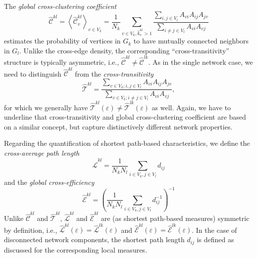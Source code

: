 The \textit{global cross-clustering coefficient}
\begin{equation}
\hat{\mathcal{C}}^{kl} = \left<\hat{\mathcal{C}}_v^{kl}\right>_{v \in V_k} = \frac{1}{N_k} \sum_{v \in V_k, \hat{k}_v^{kl}>1} \frac{\sum_{i,j \in V_l} A_{vi} A_{ij} A_{jv}}{\sum_{i \neq j \in V_l} A_{vi} A_{vj}}
\label{eq:globclustering_cross}
\end{equation}
estimates the probability of vertices in $G_k$ to have mutually connected neighbors in $G_l$. Unlike the cross-edge density, the corresponding ``cross-transitivity'' structure is typically asymmetric, i.e., $\hat{\mathcal{C}}^{kl} \neq \hat{\mathcal{C}}^{lk}$. As in the single network case, we need to distinguish $\hat{\mathcal{C}}^{kl}$ from the \textit{cross-transitivity}
\begin{equation}
\hat{\mathcal{T}}^{kl} = \frac{\sum_{v \in V_k; i,j \in V_l} A_{vi} A_{ij} A_{jv}}{\sum_{v \in V_k; i \neq j \in V_l} A_{vi}  A_{vj}},
\label{eq:transitivity_cross}
\end{equation}
for which we generally have $\hat{\mathcal{T}}^{kl}(\varepsilon) \neq \hat{\mathcal{T}}^{lk}(\varepsilon)$ as well. Again, we have to underline that cross-transitivity and global cross-clustering coefficient are based on a similar concept, but capture distinctively different network properties.

Regarding the quantification of shortest path-based characteristics, we define the \textit{cross-average path length}
\begin{equation}
\hat{\mathcal{L}}^{kl} = \frac{1}{N_k N_l} \sum_{i \in V_k, j \in V_l} d_{ij} %
\label{eq:apl_cross}
\end{equation}
and the \textit{global cross-efficiency}
\begin{equation}
\hat{\mathcal{E}}^{kl} = \left( \frac{1}{N_k N_l} \sum_{i \in V_k, j \in V_l} d_{ij}^{-1} \right)^{-1} %
\label{eq:globefficiency_cross}
\end{equation}
\noindent
Unlike $\hat{\mathcal{C}}^{kl}$ and $\hat{\mathcal{T}}^{kl}$, $\hat{\mathcal{L}}^{kl}$ and $\hat{\mathcal{E}}^{kl}$ are (as shortest path-based measures) symmetric by definition, i.e., $\hat{\mathcal{L}}^{kl}(\varepsilon)=\hat{\mathcal{L}}^{lk}(\varepsilon)$ and $\hat{\mathcal{E}}^{kl}(\varepsilon)=\hat{\mathcal{E}}^{lk}(\varepsilon)$. In the case of disconnected network components, the shortest path length $d_{ij}$ is defined as discussed for the corresponding local measures.

